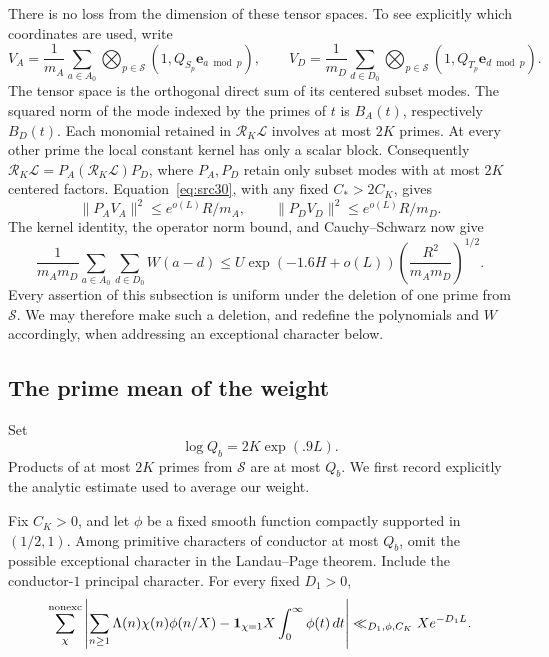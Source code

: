 There is no loss from the dimension of these tensor spaces.
To see explicitly which coordinates are used, write
\[
 V_A=\frac1{m_A}\sum_{a\in A_0}
       \bigotimes_{p\in\mathcal S}(1,Q_{S_p}\mathbf e_{a\bmod p}),
 \qquad
 V_D=\frac1{m_D}\sum_{d\in D_0}
       \bigotimes_{p\in\mathcal S}(1,Q_{T_p}\mathbf e_{d\bmod p}).
\]
The tensor space is the orthogonal direct sum of its centered subset
modes. The squared norm of the mode indexed by the primes of \(t\)
is \(B_A(t)\), respectively \(B_D(t)\).
Each monomial retained in \(\mathcal R_K\mathcal L\) involves
at most \(2K\) primes. At every other prime the local constant kernel
has only a scalar block. Consequently
\(\mathcal R_K\mathcal L=P_A(\mathcal R_K\mathcal L)P_D\),
where \(P_A,P_D\) retain only subset modes with at most \(2K\)
centered factors. Equation~\eqref{eq:src30}, with any fixed
\(C_*>2C_K\), gives
\[
 \|P_AV_A\|^2\le e^{o(L)}R/m_A,\qquad
 \|P_DV_D\|^2\le e^{o(L)}R/m_D.
\]
The kernel identity, the operator norm bound, and Cauchy--Schwarz now
give
\begin{equation}\label{eq:src32}
 \frac1{m_Am_D}\sum_{a\in A_0}\sum_{d\in D_0}W(a-d)
 \le
 U\exp(-1.6H+o(L))
           \left(\frac{R^2}{m_Am_D}\right)^{1/2}.
\end{equation}
Every assertion of this subsection is uniform under the deletion of
one prime from \(\mathcal S\). We may therefore make such a deletion,
and redefine the polynomials and \(W\) accordingly, when addressing
an exceptional character below.

\subsection{The prime mean of the weight}

Set
\begin{equation}\label{eq:supply-character-range}
 \log Q_b=2K\exp(.9L).
\end{equation}
Products of at most \(2K\) primes from \(\mathcal S\) are at most
\(Q_b\). We first record explicitly the analytic estimate used to
average our weight.

\begin{lemma}\label{lem:supply-total-prime-error}
Fix \(C_K>0\), and let \(\phi\) be a fixed smooth function compactly
supported in \((1/2,1)\). Among primitive characters of conductor
at most \(Q_b\), omit the possible exceptional character in the
Landau--Page theorem. Include the conductor-\(1\) principal character.
For every fixed \(D_1>0\),
\begin{equation}\label{eq:src33}
 \sum_{\chi}^{\mathrm{nonexc}}
 \left|
   \sum_{n\ge1}\Lambda(n)\chi(n)\phi(n/X)
       -\mathbf 1_{\chi=1}X\int_0^\infty\phi(t)\,dt
 \right|
 \ll_{D_1,\phi,C_K}Xe^{-D_1L}.
\end{equation}
\end{lemma}

